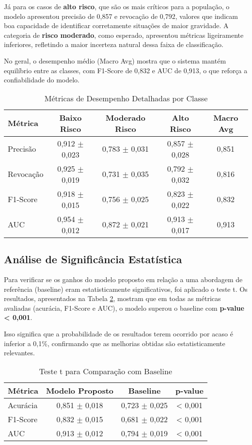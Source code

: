 Já para os casos de \textbf{alto risco}, que são os mais críticos para a população, o modelo apresentou precisão de 0,857 e revocação de 0,792, valores que indicam boa capacidade de identificar corretamente situações de maior gravidade. A categoria de \textbf{risco moderado}, como esperado, apresentou métricas ligeiramente inferiores, refletindo a maior incerteza natural dessa faixa de classificação.  

No geral, o desempenho médio (Macro Avg) mostra que o sistema mantém equilíbrio entre as classes, com F1-Score de 0,832 e AUC de 0,913, o que reforça a confiabilidade do modelo.

\begin{table}[H]
\centering
\caption{Métricas de Desempenho Detalhadas por Classe}
\label{tab:metricas_detalhadas}
\begin{tabular}{lcccc}
\toprule
\textbf{Métrica} & \textbf{Baixo Risco} & \textbf{Moderado Risco} & \textbf{Alto Risco} & \textbf{Macro Avg} \\
\midrule
Precisão & 0,912 $\pm$ 0,023 & 0,783 $\pm$ 0,031 & 0,857 $\pm$ 0,028 & 0,851 \\
Revocação & 0,925 $\pm$ 0,019 & 0,731 $\pm$ 0,035 & 0,792 $\pm$ 0,032 & 0,816 \\
F1-Score & 0,918 $\pm$ 0,015 & 0,756 $\pm$ 0,025 & 0,823 $\pm$ 0,022 & 0,832 \\
AUC & 0,954 $\pm$ 0,012 & 0,872 $\pm$ 0,021 & 0,913 $\pm$ 0,017 & 0,913 \\
\bottomrule
\end{tabular}
\end{table}

\subsection{Análise de Significância Estatística}

Para verificar se os ganhos do modelo proposto em relação a uma abordagem de referência (baseline) eram estatisticamente significativos, foi aplicado o teste t. Os resultados, apresentados na Tabela \ref{tab:teste_significancia}, mostram que em todas as métricas avaliadas (acurácia, F1-Score e AUC), o modelo superou o baseline com \textbf{p-value < 0,001}.  

Isso significa que a probabilidade de os resultados terem ocorrido por acaso é inferior a 0,1\%, confirmando que as melhorias obtidas são estatisticamente relevantes.

\begin{table}[H]
\centering
\caption{Teste t para Comparação com Baseline}
\label{tab:teste_significancia}
\begin{tabular}{lccc}
\toprule
\textbf{Métrica} & \textbf{Modelo Proposto} & \textbf{Baseline} & \textbf{p-value} \\
\midrule
Acurácia & 0,851 $\pm$ 0,018 & 0,723 $\pm$ 0,025 & < 0,001 \\
F1-Score & 0,832 $\pm$ 0,015 & 0,681 $\pm$ 0,022 & < 0,001 \\
AUC & 0,913 $\pm$ 0,012 & 0,794 $\pm$ 0,019 & < 0,001 \\
\bottomrule
\end{tabular}
\end{table}


